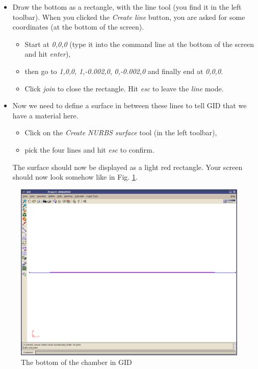 \begin{itemize}
\item Draw the bottom as a rectangle, with the line tool (you find it in
the left toolbar). When you clicked the \emph{Create line} button,
you are asked for some coordinates (at the bottom of the screen).

\begin{itemize}
\item Start at \emph{0,0,0} (type it into the command line at the bottom
of the screen and hit \emph{enter}),
\item then go to \emph{1,0},\emph{0,} \emph{1,-0.002,0}, \emph{0,-0.002,0}
and finally end at \emph{0,0,0}.
\item Click \emph{join} to close the rectangle. Hit \emph{esc} to leave
the \emph{line} mode.
\end{itemize}
\item Now we need to define a surface in between these lines to tell GID
that we have a material here.

\begin{itemize}
\item Click on the \emph{Create NURBS surface} tool (in the left toolbar),
\item pick the four lines and hit \emph{esc} to confirm.
\end{itemize}
The surface should now be displayed as a light red rectangle. Your
screen should now look somehow like in Fig. \ref{tut_fsi:3.1}.

\end{itemize}
%
\begin{figure}[h]
\includegraphics[width=1\columnwidth,keepaspectratio]{Bilder/structure_01}


\caption{\label{tut_fsi:3.1} The bottom of the chamber in GID}
\end{figure}


